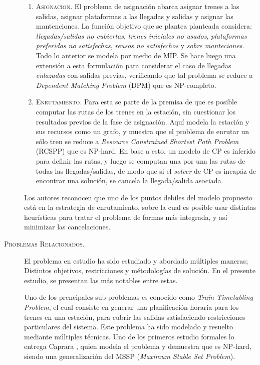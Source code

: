\documentclass[letter, 10pt]{article}
\begin{document}
\begin{description}
	\begin{enumerate}
		\item \textsc{Asignacion.} El problema de asignación abarca asignar trenes a las salidas, asignar plataformas a las llegadas y salidas y asignar las mantenciones. La función objetivo que se plantea planteada considera: \textit{llegadas/salidas no cubiertas}, \textit{trenes iniciales no usados}, \textit{plataformas preferidas no satisfechas}, \textit{reusos no satisfechos} y \textit{sobre manteciones}. Todo lo anterior se modela por medio de MIP. Se hace luego una extensión a esta formulación para considerar el caso de llegadas \textit{enlazadas} con salidas previas, verificando que tal problema se reduce a \textit{Dependent Matching Problem} (DPM) que es NP-completo.  
		\item \textsc{Enrutamiento.} Para esta se parte de la premisa de que es posible computar las rutas de los trenes en la estación, sin cuestionar los resultados previos de la fase de asignación. Aquí modela la estación y sus recursos como un grafo, y muestra que el problema de enrutar un sólo tren se reduce a \textit{Resource Constrained Shortest Path Problem} (RCSPP) que es NP-hard. En base a esto, un modelo de CP es inferido para definir las rutas, y luego se computan una por una las rutas de todas las llegadas/salidas, de modo que si el \textit{solver} de CP es incapáz de encontrar una solución, se cancela la llegada/salida asociada.
	\end{enumerate}
	Los autores reconocen que uno de los puntos debiles del modelo propuesto está en la estrategia de enrutamiento, sobre la cual es posible usar distintas heurísticas para tratar el problema de formas más integrada, y así minimizar las cancelaciones. 



	\item[\textsc{Problemas Relacionados.}] El problema en estudio ha sido estudiado y abordado múltiples maneras; Distintos objetivos, restricciones y métodologías de solución. En el presente estudio, se presentan las más notables entre estas.

	Uno de los prencipales sub-problemas es conocido como \textit{Train Timetabling Problem}, el cual consiste en generar una planificación horaria para los trenes en una estación, para cubrir las salidas satisfaciendo restricciones particulares del sistema. Este problema ha sido modelado y resuelto mediante múltiples técnicas. Uno de los primeros estudio formales lo entrega Caprara \cite{Caprara}, quien modela el problema y demuestra que es NP-hard, siendo una generalización del MSSP (\textit{Maximum Stable Set Problem}).


\end{description}
\end{document}
